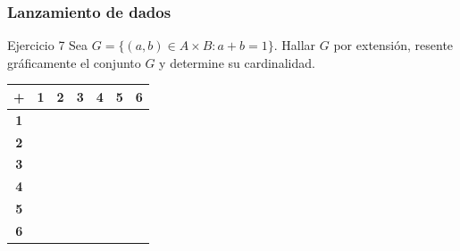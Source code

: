 \documentclass[aspectratio=169]{beamer}
\begin{document}
\begin{frame}[t]
	\frametitle{Lanzamiento de dados}
	\begin{block}{Ejercicio 7}
		Sea $G=\{(a, b)\in A\times B: a+b=1\}$. Hallar $G$ por extensión, resente gráficamente el conjunto $G $ y determine su cardinalidad.
	\end{block}


	\renewcommand{\arraystretch}{1.3} %
	\begin{flushleft}
		\begin{tabular}{|c|*{6}{c|}}
			\hline
			\cellcolor{gray!30} \textbf{+}
			                                & \cellcolor{yellow} \textbf{1}
			                                & \cellcolor{yellow} \textbf{2}
			                                & \cellcolor{yellow} \textbf{3}
			                                & \cellcolor{yellow} \textbf{4}
			                                & \cellcolor{yellow} \textbf{5}
			                                & \cellcolor{yellow} \textbf{6}               \\
			\hline
			\cellcolor{green!70} \textbf{1} &                               &  &  &  &  & \\ \hline
			\cellcolor{green!70} \textbf{2} &                               &  &  &  &  & \\ \hline
			\cellcolor{green!70} \textbf{3} &                               &  &  &  &  & \\ \hline
			\cellcolor{green!70} \textbf{4} &                               &  &  &  &  & \\ \hline
			\cellcolor{green!70} \textbf{5} &                               &  &  &  &  & \\ \hline
			\cellcolor{green!70} \textbf{6} &                               &  &  &  &  & \\
			\hline
		\end{tabular}
	\end{flushleft}
\end{frame}
\end{document}
